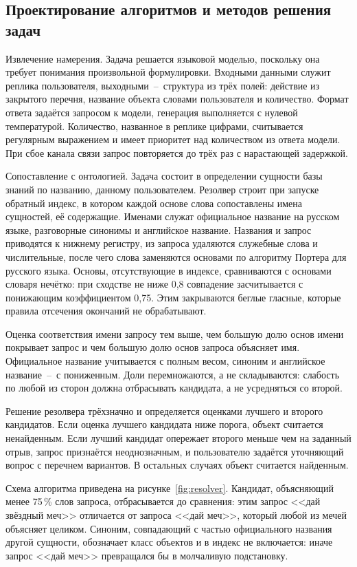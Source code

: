 \subsection{Проектирование алгоритмов и методов решения задач}

Извлечение намерения. Задача решается языковой моделью, поскольку она требует
понимания произвольной формулировки. Входными данными служит реплика пользователя,
выходными~--~структура из трёх полей: действие из закрытого перечня, название объекта
словами пользователя и количество. Формат ответа задаётся запросом к модели, генерация
выполняется с нулевой температурой. Количество, названное в реплике цифрами,
считывается регулярным выражением и имеет приоритет над количеством из ответа модели.
При сбое канала связи запрос повторяется до трёх раз с нарастающей задержкой.

Сопоставление с онтологией. Задача состоит в определении сущности базы знаний по
названию, данному пользователем. Резолвер строит при запуске обратный индекс, в котором
каждой основе слова сопоставлены имена сущностей, её содержащие. Именами служат
официальное название на русском языке, разговорные синонимы и английское название.
Названия и запрос приводятся к нижнему регистру, из запроса удаляются служебные слова и
числительные, после чего слова заменяются основами по алгоритму Портера для русского
языка. Основы, отсутствующие в индексе, сравниваются с основами словаря нечётко: при
сходстве не ниже 0,8 совпадение засчитывается с понижающим коэффициентом 0,75. Этим
закрываются беглые гласные, которые правила отсечения окончаний не обрабатывают.

Оценка соответствия имени запросу тем выше, чем большую долю основ имени покрывает
запрос и чем большую долю основ запроса объясняет имя. Официальное название учитывается
с полным весом, синоним и английское название~--~с пониженным. Доли перемножаются, а не
складываются: слабость по любой из сторон должна отбрасывать кандидата, а не усредняться
со второй.

Решение резолвера трёхзначно и определяется оценками лучшего и второго кандидатов. Если
оценка лучшего кандидата ниже порога, объект считается ненайденным. Если лучший кандидат
опережает второго меньше чем на заданный отрыв, запрос признаётся неоднозначным, и
пользователю задаётся уточняющий вопрос с перечнем вариантов. В остальных случаях объект
считается найденным.

Схема алгоритма приведена на рисунке~\ref{fig:resolver}. Кандидат, объясняющий менее
75\,\% слов запроса, отбрасывается до сравнения: этим запрос <<дай звёздный меч>>
отличается от запроса <<дай меч>>, который любой из мечей объясняет целиком. Синоним,
совпадающий с частью официального названия другой сущности, обозначает класс объектов и
в индекс не включается: иначе запрос <<дай меч>> превращался бы в молчаливую подстановку.

